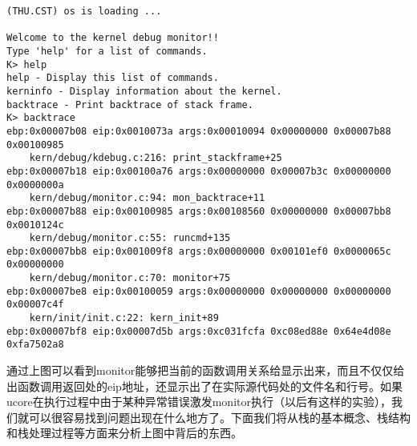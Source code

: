 \begin{enumerate}
\begin{lstlisting}
(THU.CST) os is loading ...

Welcome to the kernel debug monitor!!
Type 'help' for a list of commands.
K> help
help - Display this list of commands.
kerninfo - Display information about the kernel.
backtrace - Print backtrace of stack frame.
K> backtrace
ebp:0x00007b08 eip:0x0010073a args:0x00010094 0x00000000 0x00007b88 0x00100985 
    kern/debug/kdebug.c:216: print_stackframe+25
ebp:0x00007b18 eip:0x00100a76 args:0x00000000 0x00007b3c 0x00000000 0x0000000a 
    kern/debug/monitor.c:94: mon_backtrace+11
ebp:0x00007b88 eip:0x00100985 args:0x00108560 0x00000000 0x00007bb8 0x0010124c 
    kern/debug/monitor.c:55: runcmd+135
ebp:0x00007bb8 eip:0x001009f8 args:0x00000000 0x00101ef0 0x0000065c 0x00000000 
    kern/debug/monitor.c:70: monitor+75
ebp:0x00007be8 eip:0x00100059 args:0x00000000 0x00000000 0x00000000 0x00007c4f 
    kern/init/init.c:22: kern_init+89
ebp:0x00007bf8 eip:0x00007d5b args:0xc031fcfa 0xc08ed88e 0x64e4d08e 0xfa7502a8
\end{lstlisting}

  通过上图可以看到monitor能够把当前的函数调用关系给显示出来，而且不仅仅给出函数调用返回处的eip地址，还显示出了在实际源代码处的文件名和行号。如果ucore在执行过程中由于某种异常错误激发monitor执行（以后有这样的实验），我们就可以很容易找到问题出现在什么地方了。下面我们将从栈的基本概念、栈结构和栈处理过程等方面来分析上图中背后的东西。
\end{enumerate}

